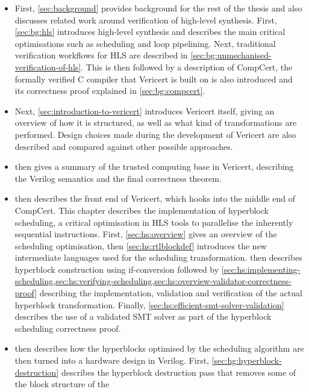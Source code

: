\begin{itemize}
\item First, \cref{sec:background} provides background for the rest of the
  thesis and also discusses related work around verification of high-level
  synthesis.  First, \cref{sec:bg:hls} introduces high-level synthesis and
  describes the main critical optimisations such as scheduling and loop
  pipelining. Next, traditional verification workflows for \gls{HLS} are
  described in \cref{sec:bg:unmechanised-verification-of-hls}. This is then
  followed by a description of CompCert, the formally verified C compiler that
  Vericert is built on is also introduced and its correctness proof explained in
  \cref{sec:bg:compcert}.
\item Next, \cref{sec:introduction-to-vericert} introduces Vericert itself,
  giving an overview of how it is structured, as well as what kind of
  transformations are performed.  Design choices made during the development of
  Vericert are also described and compared against other possible approaches.
\item {} then gives a summary of the trusted
  computing base in Vericert, describing the Verilog semantics and the final
  correctness theorem.
\item {} then describes the front end of Vericert,
  which hooks into the middle end of CompCert.  This chapter describes the
  implementation of hyperblock scheduling, a critical optimisation in \gls{HLS}
  tools to parallelise the inherently sequential instructions.  First,
  \cref{sec:hs:overview} gives an overview of the scheduling optimisation, then
  \cref{sec:hs:rtlblockdef} introduces the new intermediate languages used for
  the scheduling transformation.   then describes
  hyperblock construction using if-conversion followed by
  \cref{sec:hs:implementing-scheduling,sec:hs:verifying-scheduling,sec:hs:overview-validator-correctness-proof}
  describing the implementation, validation and verification of the actual
  hyperblock transformation.  Finally,
  \cref{sec:hs:efficient-smt-solver-validation} describes the use of a validated
  SMT solver as part of the hyperblock scheduling correctness proof.
\item {} then describes how the hyperblocks
  optimised by the scheduling algorithm are then turned into a hardware design
  in Verilog.  First, \cref{sec:hg:hyperblock-destruction} describes the
  hyperblock destruction pass that removes some of the block structure of the

\end{itemize}
